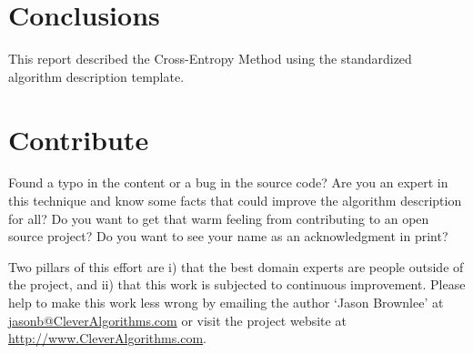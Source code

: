\documentclass[a4paper, 11pt]{article}
\makeatletter
\newcommand{\myreportauthor}{Jason Brownlee}
\newcommand{\myreportemail}{jasonb@CleverAlgorithms.com}
\newcommand{\myreportwebsite}{http://www.CleverAlgorithms.com}
\makeatother
\begin{document}
% 
% 
\section{Conclusions}
\label{sec:conclusions}
This report described the Cross-Entropy Method using the standardized algorithm description template.

% 
% 
\section{Contribute}
\label{sec:contribute}
Found a typo in the content or a bug in the source code? 
Are you an expert in this technique and know some facts that could improve the algorithm description for all?
Do you want to get that warm feeling from contributing to an open source project? 
Do you want to see your name as an acknowledgment in print?

Two pillars of this effort are i) that the best domain experts are people outside of the project, and ii) that this work is subjected to continuous improvement. 
Please help to make this work less wrong by emailing the author `\myreportauthor' at \url{\myreportemail} or visit the project website at \url{\myreportwebsite}.



\end{document}
